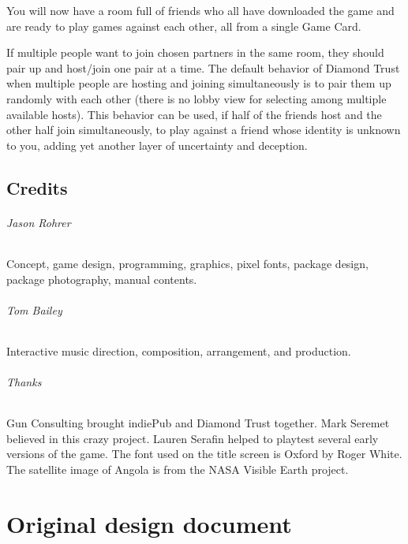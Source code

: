 \documentclass[8pt]{extbook}
\begin{document}
You will now have a room full of friends who all have downloaded the game and are ready to play games against each other, all from a single Game Card.

If multiple people want to join chosen partners in the same room, they should pair up and host/join one pair at a time.  The default behavior of Diamond Trust when multiple people are hosting and joining simultaneously is to pair them up randomly with each other (there is no lobby view for selecting among multiple available hosts).  This behavior can be used, if half of the friends host and the other half join simultaneously, to play against a friend whose identity is unknown to you, adding yet another layer of uncertainty and deception.


\chapter*{Credits}

\paragraph{Jason Rohrer}
Concept, game design, programming, graphics, pixel fonts, package design, package photography, manual contents.

\paragraph{Tom Bailey}
Interactive music direction, composition, arrangement, and production.

\paragraph{Thanks}
Gun Consulting brought indiePub and Diamond Trust together.  Mark Seremet believed in this crazy project.  Lauren Serafin helped to playtest several early versions of the game.  The font used on the title screen is Oxford by Roger White.  The satellite image of Angola is from the NASA Visible Earth project.




\part{Original design document}
\addtocounter{chapter}{1}
\setcounter{section}{0}


\end{document}
